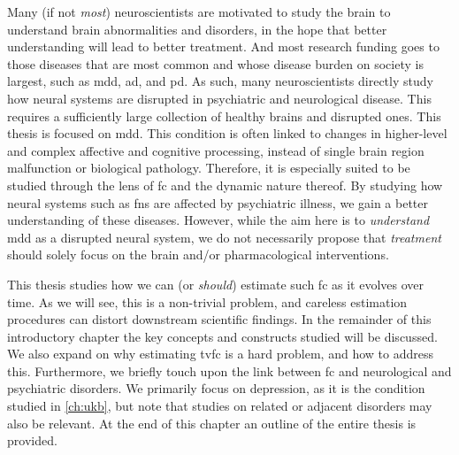 Many (if not \emph{most}) neuroscientists are motivated to study the brain to understand brain abnormalities and disorders, in the hope that better understanding will lead to better treatment.
And most research funding goes to those diseases that are most common and whose disease burden on society is largest, such as \gls{mdd}, \gls{ad}, and \gls{pd}.
As such, many neuroscientists directly study how neural systems are disrupted in psychiatric and neurological disease.
This requires a sufficiently large collection of healthy brains and disrupted ones.
%
This thesis is focused on \gls{mdd}.
This condition is often linked to changes in higher-level and complex affective and cognitive processing, instead of single brain region malfunction or biological pathology.
Therefore, it is especially suited to be studied through the lens of \gls{fc} and the dynamic nature thereof.
By studying how neural systems such as \glspl{fn} are affected by psychiatric illness, we gain a better understanding of these diseases.
However, while the aim here is to \emph{understand} \gls{mdd} as a disrupted neural system, we do not necessarily propose that \emph{treatment} should solely focus on the brain and/or pharmacological interventions.

This thesis studies how we can (or \emph{should}) estimate such \gls{fc} as it evolves over time.
As we will see, this is a non-trivial problem, and careless estimation procedures can distort downstream scientific findings.
In the remainder of this introductory chapter the key concepts and constructs studied will be discussed.
We also expand on why estimating \gls{tvfc} is a hard problem, and how to address this.
Furthermore, we briefly touch upon the link between \gls{fc} and neurological and psychiatric disorders.
We primarily focus on depression, as it is the condition studied in \cref{ch:ukb}, but note that studies on related or adjacent disorders may also be relevant.
At the end of this chapter an outline of the entire thesis is provided.
